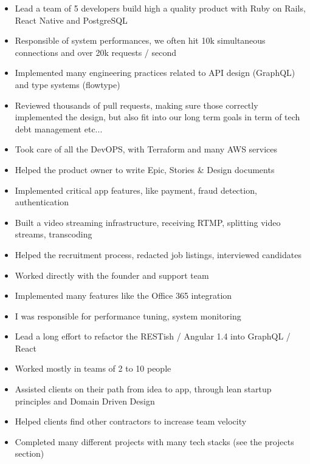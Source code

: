 \documentclass[10pt,a4paper,ragged2e,withhyper]{altacv}
\begin{document}
\begin{paracol}{2}


  \begin{itemize}
    \item Lead a team of 5 developers build high a quality product with Ruby on Rails, React Native and PostgreSQL
    \item Responsible of system performances, we often hit 10k simultaneous connections and over 20k requests / second
    \item Implemented many engineering practices related to API design (GraphQL) and type systems (flowtype)
    \item Reviewed thousands of pull requests, making sure those correctly implemented the design,
      but also fit into our long term goals in term of tech debt management etc...
    \item Took care of all the DevOPS, with Terraform and many AWS services
    \item Helped the product owner to write Epic, Stories \& Design documents
    \item Implemented critical app features, like payment, fraud detection, authentication
    \item Built a video streaming infrastructure, receiving RTMP, splitting video streams, transcoding
    \item Helped the recruitment process, redacted job listings, interviewed candidates
  \end{itemize}

  \divider

  \begin{itemize}
    \item Worked directly with the founder and support team
    \item Implemented many features like the Office 365 integration
    \item I was responsible for performance tuning, system monitoring
    \item Lead a long effort to refactor the RESTish / Angular 1.4 into GraphQL / React
  \end{itemize}

  \divider

  \begin{itemize}
    \item Worked mostly in teams of 2 to 10 people
    \item Assisted clients on their path from idea to app, through lean startup principles and Domain Driven Design
    \item Helped clients find other contractors to increase team velocity
    \item Completed many different projects with many tech stacks (see the projects section)
  \end{itemize}


\end{paracol}
\end{document}

